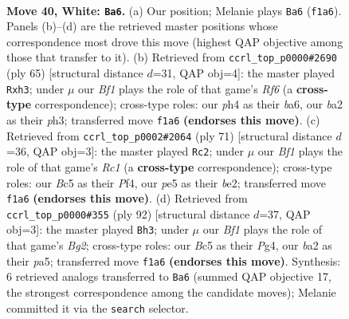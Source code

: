 \documentclass[11pt]{article}
\begin{document}
\clearpage

\begin{figure}[p]\centering
\begin{subfigure}{0.46\textwidth}\centering
\resizebox{\linewidth}{!}{%
\newchessgame
\chessboard[
  setfen={1R6/6k1/8/2B1p3/4r2p/5p1P/b4P1K/5B2 w - - 8 40},
  showmover=false,
  pgfstyle=straightmove, color=movearrow, markmove={f1-a6}
]}
\caption{}
\end{subfigure}\hfill
\begin{subfigure}{0.46\textwidth}\centering
\resizebox{\linewidth}{!}{%
\newchessgame
\chessboard[
  setfen={8/2k2p2/B6R/7P/3p4/5r1P/bP1K4/8 b - - 1 33},
  showmover=false,
  pgfstyle=straightmove, color=movearrow, markmove={f3-h3}
]}
\caption{}
\end{subfigure}
\\[4pt]
\begin{subfigure}{0.46\textwidth}\centering
\resizebox{\linewidth}{!}{%
\newchessgame
\chessboard[
  setfen={2r5/5pk1/7p/3R3P/P4p2/8/4BbPK/8 b - - 0 36},
  showmover=false,
  pgfstyle=straightmove, color=movearrow, markmove={c8-c2}
]}
\caption{}
\end{subfigure}\hfill
\begin{subfigure}{0.46\textwidth}\centering
\resizebox{\linewidth}{!}{%
\newchessgame
\chessboard[
  setfen={5k2/1R6/4pn1p/p3r3/6P1/6P1/5PB1/6K1 w - - 0 47},
  showmover=false,
  pgfstyle=straightmove, color=movearrow, markmove={g2-h3}
]}
\caption{}
\end{subfigure}
\caption{\textbf{Move 40, White: \texttt{Ba6}.} (a) Our position; Melanie plays \texttt{Ba6} (\texttt{f1a6}). Panels (b)--(d) are the retrieved master positions whose correspondence most drove this move (highest QAP objective among those that transfer to it). (b) Retrieved from \texttt{ccrl\_top\_p0000\#2690} (ply 65) [structural distance $d$=31, QAP obj=4]: the master played \texttt{Rxh3}; under $\mu$ our \emph{Bf1} plays the role of that game's \emph{Rf6} (a \textbf{cross-type} correspondence); cross-type roles: our \emph{p}h4 as their \emph{b}a6, our \emph{b}a2 as their \emph{p}h3; transferred move \texttt{f1a6} \textbf{(endorses this move)}. (c) Retrieved from \texttt{ccrl\_top\_p0002\#2064} (ply 71) [structural distance $d$=36, QAP obj=3]: the master played \texttt{Rc2}; under $\mu$ our \emph{Bf1} plays the role of that game's \emph{Rc1} (a \textbf{cross-type} correspondence); cross-type roles: our \emph{B}c5 as their \emph{P}f4, our \emph{p}e5 as their \emph{b}e2; transferred move \texttt{f1a6} \textbf{(endorses this move)}. (d) Retrieved from \texttt{ccrl\_top\_p0000\#355} (ply 92) [structural distance $d$=37, QAP obj=3]: the master played \texttt{Bh3}; under $\mu$ our \emph{Bf1} plays the role of that game's \emph{Bg2}; cross-type roles: our \emph{B}c5 as their \emph{P}g4, our \emph{b}a2 as their \emph{p}a5; transferred move \texttt{f1a6} \textbf{(endorses this move)}. Synthesis: 6 retrieved analogs transferred to \texttt{Ba6} (summed QAP objective 17, the strongest correspondence among the candidate moves); Melanie committed it via the \texttt{search} selector.}
\label{fig:thought-m78}
\end{figure}
\end{document}
